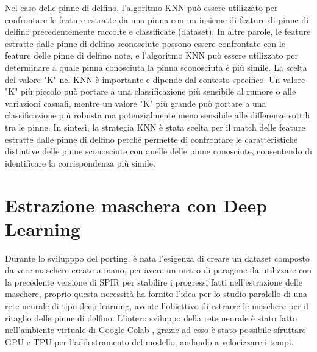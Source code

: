 \documentclass[a4paper,12pt]{report}
\begin{document}
      Nel caso delle pinne di delfino, l'algoritmo KNN può essere utilizzato per confrontare le feature estratte da una pinna con un insieme di feature di pinne di delfino precedentemente raccolte e classificate (dataset). In altre parole, le feature estratte dalle pinne di delfino sconosciute possono essere confrontate con le feature delle pinne di delfino note, e l'algoritmo KNN può essere utilizzato per determinare a quale pinna conosciuta la pinna sconosciuta è più simile.
      La scelta del valore "K" nel KNN è importante e dipende dal contesto specifico. Un valore "K" più piccolo può portare a una classificazione più sensibile al rumore o alle variazioni casuali, mentre un valore "K" più grande può portare a una classificazione più robusta ma potenzialmente meno sensibile alle differenze sottili tra le pinne.
      In sintesi, la strategia KNN è stata scelta per il match delle feature estratte dalle pinne di delfino perché permette di confrontare le caratteristiche distintive delle pinne sconosciute con quelle delle pinne conosciute, consentendo di identificare la corrispondenza più simile.





      \newpage
    \section{Estrazione maschera con Deep Learning}
      Durante lo svilupppo del porting, è nata l'esigenza di creare un dataset
      composto da vere maschere create a mano, per avere un metro di paragone da
      utilizzare con la precedente versione di SPIR per stabilire i progressi fatti nell'estrazione
      delle maschere, proprio questa necessità ha fornito l'idea per lo studio paralello di
      una rete neurale di tipo deep learning, avente l'obiettivo di estrarre le maschere per il 
      ritaglio delle pinne di delfino.
      L'intero sviluppo della rete neurale è stato fatto 
      nell'ambiente virtuale di Google Colab \cite{colab}, grazie ad esso è stato 
      possibile sfruttare GPU e TPU per l'addestramento del modello, andando a velocizzare i tempi.
\end{document}
